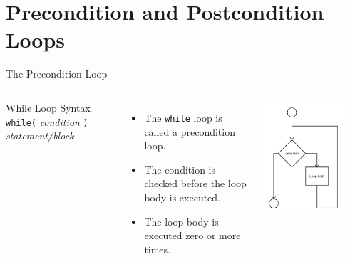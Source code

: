 \documentclass[]{beamer}
\begin{document}
\section{Precondition and Postcondition Loops}
\begin{frame}[fragile]{The Precondition Loop}
  \begin{columns}

    \begin{block}{While Loop Syntax}
      \verb!while(! \textit{condition} \verb!)! 
      \newline\verb!    ! \textit{statement/block}
    \end{block}
    
    \vspace{0.5cm}

    \begin{itemize}[<+(1)->]
        \item The \texttt{while} loop is called a precondition loop.
        \item The condition is checked before the loop body is
            executed.
        \item The loop body is executed zero or more times.
    \end{itemize}

    \begin{center}
      \includegraphics[width=0.8\textwidth]{images/while}
    \end{center}
  \end{columns}
\end{frame}
\end{document}
